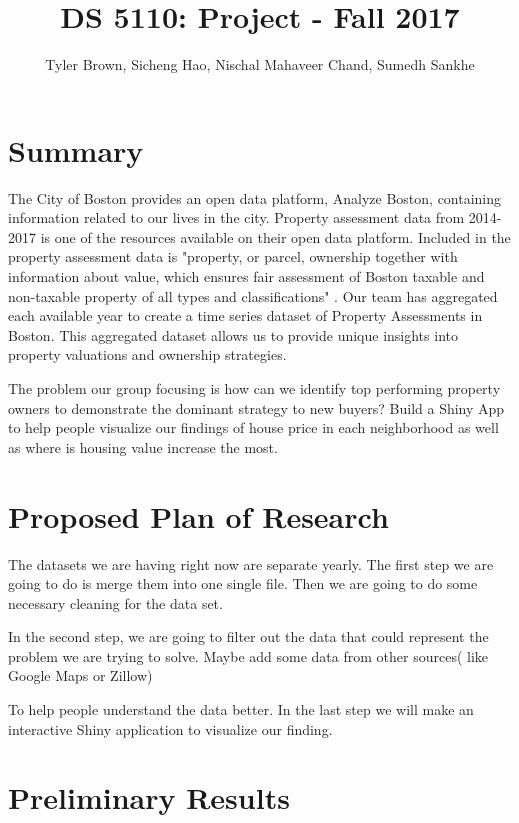 \documentclass[12pt]{article}
\title{DS 5110: Project - Fall 2017}
\author{Tyler Brown, Sicheng Hao, Nischal Mahaveer Chand, Sumedh Sankhe}
\date{ }
\begin{document}
\maketitle

\section{Summary}

The City of Boston provides an open data platform, Analyze Boston, 
containing information related to our lives in the city. Property 
assessment data from 2014-2017 is one of the resources available on their
 open data platform. Included in the property assessment data is 
"property, or parcel, ownership together with information about value, 
which ensures fair assessment of Boston taxable and non-taxable property 
of all types and classifications" \cite{Property49:online}. Our team 
has aggregated each available year to create a time series dataset of 
Property Assessments in Boston. This aggregated dataset allows us to 
provide unique insights into property valuations and ownership strategies.

The problem our group focusing is how can we identify top performing 
property owners to demonstrate the dominant strategy to new buyers? Build
 a Shiny App to help people visualize our findings of house price in each
 neighborhood as well as where is housing value increase the most. 

\section{Proposed Plan of Research}

 The datasets we are having right now are separate yearly. The first step 
we are going to do is merge them into one single file. Then we are going 
to do some necessary cleaning for the data set. 

In the second step, we are going to filter out the data that could 
represent the problem we are trying to solve. Maybe add some data from 
other sources( like Google Maps or Zillow)

To help people understand the data better. In the last step we will make 
an interactive Shiny application to visualize our finding. 


\section{Preliminary Results}
\end{document}
